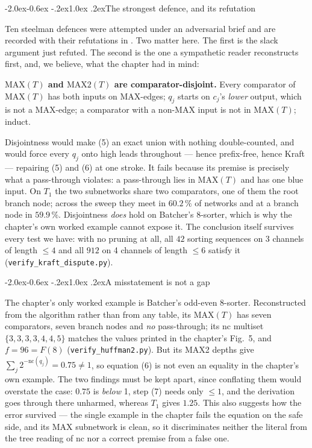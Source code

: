 \documentclass[11pt,a4paper]{article}
\makeatletter
\renewenvironment{quote}{\begin{oldquote}\small}{\end{oldquote}}
\renewcommand\subsection{\@startsection{subsection}{2}{\z@}%
  {-2.0ex\@plus -0.6ex \@minus -.2ex}{1.0ex \@plus .2ex}{\normalfont\normalsize\bfseries}}
\newcommand{\MAX}{\mathrm{MAX}}
\newcommand{\MAXTWO}{\mathrm{MAX2}}
\newcommand{\nc}{\mathrm{nc}}
\makeatother
\begin{document}
\subsection{The strongest defence, and its refutation}

Ten steelman defences were attempted under an adversarial brief and are recorded
with their refutations in \cite{Art}. Two matter here. The first is the
slack argument just refuted. The second is the one a sympathetic reader
reconstructs first, and, we believe, what the chapter had in mind:

\begin{quote}
\textbf{$\MAX(T)$ and $\MAXTWO(T)$ are comparator-disjoint.} Every comparator of
$\MAX(T)$ has both inputs on MAX-edges; $q_j$ starts on $c_j$'s \emph{lower}
output, which is not a MAX-edge; a comparator with a non-MAX input is not in
$\MAX(T)$; induct.
\end{quote}

Disjointness would make (5) an exact union with nothing double-counted, and
would force every $q_j$ onto high leads throughout --- hence prefix-free, hence
Kraft --- repairing (5) and (6) at one stroke. It fails because its premise is
precisely what a pass-through violates: a pass-through lies in $\MAX(T)$ and has
one blue input. On $T_1$ the two subnetworks share two comparators, one of them
the root branch node; across the sweep they meet in $60.2\,\%$ of networks and
at a branch node in $59.9\,\%$. Disjointness \emph{does} hold on Batcher's
8-sorter, which is why the chapter's own worked example cannot expose it. The
conclusion itself survives every test we have: with no pruning at all, all $42$
sorting sequences on 3 channels of length $\le 4$ and all $912$ on 4 channels of
length $\le 6$ satisfy it (\texttt{verify\_kraft\_dispute.py}).

\subsection{A misstatement is not a gap}

The chapter's only worked example is Batcher's odd-even 8-sorter. Reconstructed
from the algorithm rather than from any table, its $\MAX(T)$ has seven
comparators, seven branch nodes and \emph{no} pass-through; its $\nc$ multiset
$\{3,3,3,3,4,4,5\}$ matches the values printed in the chapter's Fig.~5, and
$f = 96 = F(8)$ (\texttt{verify\_huffman2.py}). But its MAX2 depths give
$\sum_j 2^{-\nc(q_j)} = 0.75 \ne 1$, so equation (6) is not even an equality in
the chapter's own example. The two findings must be kept apart, since conflating
them would overstate the case: $0.75$ is \emph{below} 1, step (7) needs only
$\le 1$, and the derivation goes through there unharmed, whereas $T_1$ gives
$1.25$. This also suggests how the error survived --- the single example in the
chapter fails the equation on the safe side, and its MAX subnetwork is clean, so
it discriminates neither the literal from the tree reading of $\nc$ nor a
correct premise from a false one.
\end{document}

